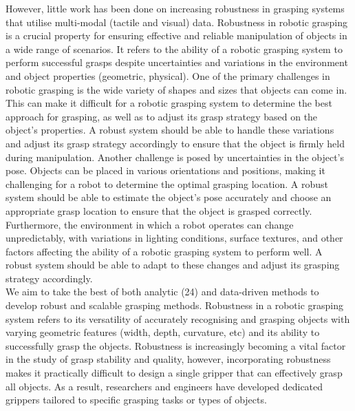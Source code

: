 \documentclass[11pt, a4paper]{report}
\begin{document}
However, little work has been done on increasing robustness in grasping systems that utilise multi-modal (tactile and visual) data. Robustness in robotic grasping is a crucial property for ensuring effective and reliable manipulation of objects in a wide range of scenarios. It refers to the ability of a robotic grasping system to perform successful grasps despite uncertainties and variations in the environment and object properties (geometric, physical). One of the primary challenges in robotic grasping is the wide variety of shapes and sizes that objects can come in. This can make it difficult for a robotic grasping system to determine the best approach for grasping, as well as to adjust its grasp strategy based on the object's properties. A robust system should be able to handle these variations and adjust its grasp strategy accordingly to ensure that the object is firmly held during manipulation. Another challenge is posed by uncertainties in the object's pose. Objects can be placed in various orientations and positions, making it challenging for a robot to determine the optimal grasping location. A robust system should be able to estimate the object's pose accurately and choose an appropriate grasp location to ensure that the object is grasped correctly. Furthermore, the environment in which a robot operates can change unpredictably, with variations in lighting conditions, surface textures, and other factors affecting the ability of a robotic grasping system to perform well. A robust system should be able to adapt to these changes and adjust its grasping strategy accordingly.\\


We aim to take the best of both analytic (24) and data-driven methods \cite{berscheid2020selfsupervised, pinto2015supersizing} to develop robust and scalable grasping methods. Robustness in a robotic grasping system refers to its versatility of accurately recognising and grasping objects with varying geometric features (width, depth, curvature, etc) and its ability to successfully grasp the objects. Robustness is increasingly becoming a vital factor in the study of grasp stability and quality, however, incorporating robustness makes it practically difficult to design a single gripper that can effectively grasp all objects. As a result, researchers and engineers have developed dedicated grippers tailored to specific grasping tasks or types of objects.\\
\end{document}
